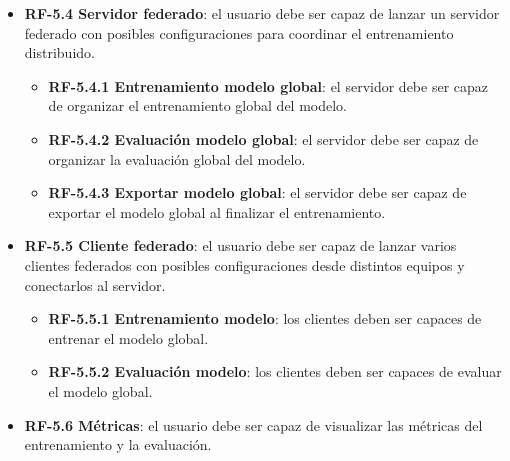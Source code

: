 \begin{itemize}
\begin{itemize}
        \item \textbf{RF-5.4 Servidor federado}: el usuario debe ser capaz de lanzar un servidor federado con posibles configuraciones para coordinar el entrenamiento distribuido.
        \begin{itemize}
            \item \textbf{RF-5.4.1 Entrenamiento modelo global}: el servidor debe ser capaz de organizar el entrenamiento global del modelo.
            \item \textbf{RF-5.4.2 Evaluación modelo global}: el servidor debe ser capaz de organizar la evaluación global del modelo.
            \item \textbf{RF-5.4.3 Exportar modelo global}: el servidor debe ser capaz de exportar el modelo global al finalizar el entrenamiento.
        \end{itemize}
        \item \textbf{RF-5.5 Cliente federado}: el usuario debe ser capaz de lanzar varios clientes federados con posibles configuraciones desde distintos equipos y conectarlos al servidor.
        \begin{itemize}
            \item \textbf{RF-5.5.1 Entrenamiento modelo}: los clientes deben ser capaces de entrenar el modelo global.
            \item \textbf{RF-5.5.2 Evaluación modelo}: los clientes deben ser capaces de evaluar el modelo global.
        \end{itemize}   
        \item \textbf{RF-5.6 Métricas}: el usuario debe ser capaz de visualizar las métricas del entrenamiento y la evaluación.
    \end{itemize}
\end{itemize}

